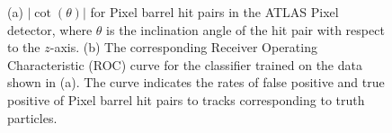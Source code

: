 \begin{figure}[htbp!] 
    \centering
    \hfill%
    \caption{(a) $\lvert \cot(\theta) \rvert$ for Pixel barrel hit pairs in the ATLAS Pixel detector, where $\theta$ is the inclination angle of the hit pair with respect to the $z$-axis. (b) The corresponding Receiver Operating Characteristic (ROC) curve for the classifier trained on the data shown in (a). The curve indicates the rates of false positive and true positive of Pixel barrel hit pairs to tracks corresponding to truth particles.}
    \label{fig:1-dimensional-classifier-training}
\end{figure}


